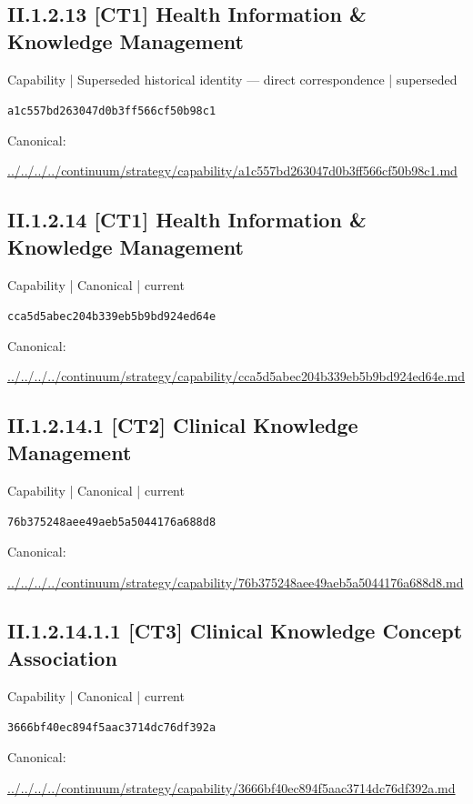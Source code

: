 \documentclass[10pt,a4paper]{article}
\begin{document}
\subsection*{II.1.2.13 [CT1] Health Information \& Knowledge Management}
{\small Capability | Superseded historical identity — direct correspondence | superseded}\par
\texttt{a1c557bd263047d0b3ff566cf50b98c1}\par
Canonical: \par
{\footnotesize\url{../../../../continuum/strategy/capability/a1c557bd263047d0b3ff566cf50b98c1.md}}\par
\subsection*{II.1.2.14 [CT1] Health Information \& Knowledge Management}
{\small Capability | Canonical | current}\par
\texttt{cca5d5abec204b339eb5b9bd924ed64e}\par
Canonical: \par
{\footnotesize\url{../../../../continuum/strategy/capability/cca5d5abec204b339eb5b9bd924ed64e.md}}\par
\subsection*{II.1.2.14.1 [CT2] Clinical Knowledge Management}
{\small Capability | Canonical | current}\par
\texttt{76b375248aee49aeb5a5044176a688d8}\par
Canonical: \par
{\footnotesize\url{../../../../continuum/strategy/capability/76b375248aee49aeb5a5044176a688d8.md}}\par
\subsection*{II.1.2.14.1.1 [CT3] Clinical Knowledge Concept Association}
{\small Capability | Canonical | current}\par
\texttt{3666bf40ec894f5aac3714dc76df392a}\par
Canonical: \par
{\footnotesize\url{../../../../continuum/strategy/capability/3666bf40ec894f5aac3714dc76df392a.md}}\par
\end{document}
